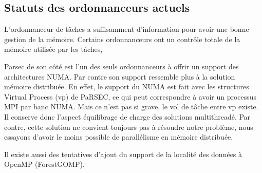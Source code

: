 \subsection{Statuts des ordonnanceurs actuels}
L'ordonnanceur de tâches a suffisamment d'information pour avoir une bonne gestion de la mémoire.
%
Certains ordonnanceurs ont un contrôle totale de la mémoire utilisée par les tâches,




Parsec de son côté est l'un des seuls ordonnanceurs à offrir un support des architectures NUMA.
%
Par contre son support ressemble plus à la solution mémoire distribuée.
%
En effet, le support du NUMA est fait avec les structures Virtual Process (vp) de PaRSEC, ce qui peut correspondre à avoir un processus MPI par banc NUMA.
%
Mais ce n'est pas si grave, le vol de tâche entre vp existe.
%
Il conserve donc l'aspect équilibrage de charge des solutions multithreadé.
%
Par contre, cette solution ne convient toujours pas à résoudre notre problème, nous essayons d'avoir le moins possible de parallélisme en mémoire distribuée.


Il existe aussi des tentatives d'ajout du support de la localité des données à OpenMP (ForestGOMP).

